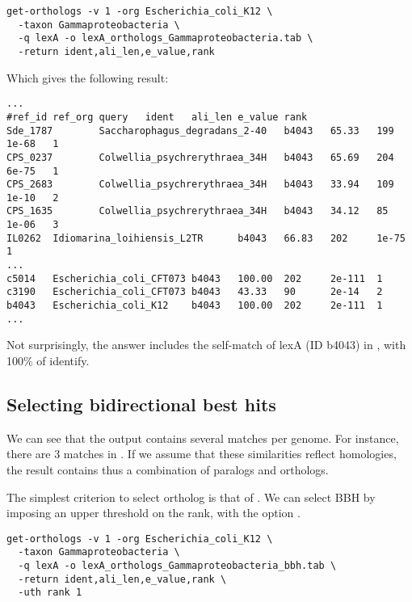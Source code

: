 \begin{footnotesize}
\begin{verbatim}
get-orthologs -v 1 -org Escherichia_coli_K12 \
  -taxon Gammaproteobacteria \
  -q lexA -o lexA_orthologs_Gammaproteobacteria.tab \
  -return ident,ali_len,e_value,rank 
\end{verbatim}
\end{footnotesize}

Which gives the following result:

\begin{scriptsize}
\begin{verbatim}
...
#ref_id ref_org query   ident   ali_len e_value rank
Sde_1787        Saccharophagus_degradans_2-40   b4043   65.33   199     1e-68   1
CPS_0237        Colwellia_psychrerythraea_34H   b4043   65.69   204     6e-75   1
CPS_2683        Colwellia_psychrerythraea_34H   b4043   33.94   109     1e-10   2
CPS_1635        Colwellia_psychrerythraea_34H   b4043   34.12   85      1e-06   3
IL0262  Idiomarina_loihiensis_L2TR      b4043   66.83   202     1e-75   1
...
c5014   Escherichia_coli_CFT073 b4043   100.00  202     2e-111  1
c3190   Escherichia_coli_CFT073 b4043   43.33   90      2e-14   2
b4043   Escherichia_coli_K12    b4043   100.00  202     2e-111  1
...
\end{verbatim}
\end{scriptsize}

Not surprisingly, the answer includes the self-match of lexA (ID
b4043) in , with 100\% of identify.

\subsection{Selecting bidirectional best hits}

We can see that the output contains several matches per genome. For
instance, there are 3 matches in . If we assume that these similarities reflect homologies, the
result contains thus a combination of paralogs and orthologs. 

The simplest criterion to select ortholog is that of
\concept{bidirectional best hit (BBH)}. We can select BBH by imposing
an upper threshold on the rank, with the option .

\begin{footnotesize}
\begin{verbatim}
get-orthologs -v 1 -org Escherichia_coli_K12 \
  -taxon Gammaproteobacteria \
  -q lexA -o lexA_orthologs_Gammaproteobacteria_bbh.tab \
  -return ident,ali_len,e_value,rank \
  -uth rank 1 
\end{verbatim}
\end{footnotesize}

